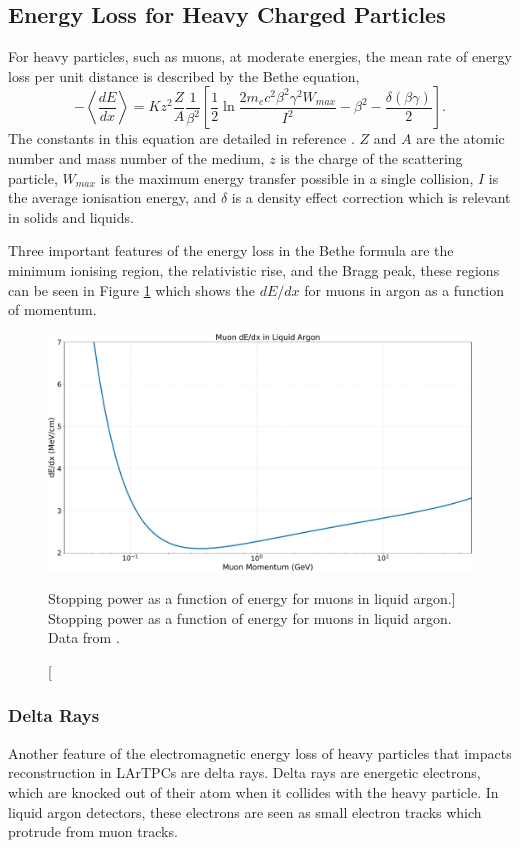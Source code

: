\subsection{Energy Loss for Heavy Charged Particles}
For heavy particles, such as muons, at moderate energies, the mean rate of 
energy loss per unit distance is described by the Bethe equation,
\begin{equation}
	- \left< \frac{dE}{dx}\right> = K z^2 \frac{Z}{A} \frac{1}{\beta^2} 
	\left[ \frac{1}{2} \ln \frac{2 m_e c^2 \beta^2 \gamma^2 W_{max}}{I^2} -
	\beta^2 - \frac{\delta(\beta \gamma)}{2}\right].
	\label{eq:mu_stop}
\end{equation}
The constants in this equation are detailed in reference
\cite{PhysRevD.98.030001}. $Z$ and $A$ are the atomic number and mass number of
the medium, $z$ is the charge of the scattering particle, $W_{max}$ is the 
maximum energy transfer possible in a single collision, $I$ is the average 
ionisation energy, and $\delta$ is a density effect correction which is 
relevant in solids and liquids. 

Three important features of the energy loss in the Bethe formula are the minimum
ionising region, the relativistic rise, and the Bragg peak, these regions can be
seen in Figure \ref{fig:muon_dedx} which shows the $dE/dx$ for muons in argon 
as a function of momentum. 

\begin{figure}
	\centering
	\includegraphics[width=\textwidth]{figures/muon_dedx_argon.pdf}
	\caption
	[Stopping power as a function of energy for muons in liquid argon.]
	{ Stopping power as a function of energy for muons in liquid argon. Data from
	\cite{pdg_atomictables}.}
	\label{fig:muon_dedx}
\end{figure}

\subsubsection*{Delta Rays}
Another feature of the electromagnetic energy loss of heavy particles that
impacts reconstruction in LArTPCs are delta rays. Delta rays are energetic
electrons, which are knocked out of their atom when it collides with the heavy
particle. In liquid argon detectors, these electrons are seen as small electron 
tracks which protrude from muon tracks. 

